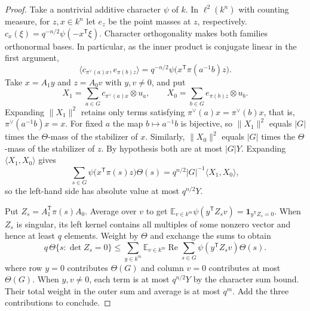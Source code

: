 \begin{proof}
Take a nontrivial additive character $\psi$ of $k$. In $\ell^2(k^n)$ with counting measure,
for $z,x\in k^n$ let $e_z$ be the point masses at $z$, respectively.
$c_x(\xi)=q^{-n/2}\psi(-x^{\mathsf T}\xi)$.
Character orthogonality makes both families orthonormal bases. In particular, as the inner product is conjugate linear in the first argument,
\[
 \langle c_{\pi^\vee(a)x},e_{\pi(b)z}\rangle
 =q^{-n/2}\psi\bigl(x^{\mathsf T}\pi(a^{-1}b)z\bigr).
\]
Take $x=A_1y$ and $z=A_0v$ with $y,v\ne0$, and put
\[
 X_1=\sum_{a\in G}c_{\pi^\vee(a)x}\otimes u_a,\qquad
 X_0=\sum_{b\in G}e_{\pi(b)z}\otimes u_b .
\]
Expanding $\|X_1\|^2$ retains only terms satisfying $\pi^\vee(a)x=\pi^\vee(b)x$, that is,
$\pi^\vee(a^{-1}b)x=x$. For fixed $a$ the map $b\mapsto a^{-1}b$ is bijective,
so $\|X_1\|^2$ equals $|G|$ times the $\Theta$-mass of the stabilizer of $x$.
Similarly, $\|X_0\|^2$ equals $|G|$ times the $\Theta$-mass of the stabilizer of $z$.
By hypothesis both are at most $|G|Y$. Expanding $\langle X_1,X_0\rangle$ gives
\[
 \sum_{s\in G}\psi\bigl(x^{\mathsf T}\pi(s)z\bigr)\Theta(s)
    =q^{n/2}|G|^{-1}\langle X_1,X_0\rangle ,
\]
so the left-hand side has absolute value at most $q^{n/2}Y$.

Put $Z_s=A_1^{\mathsf T}\pi(s)A_0$. Average over $v$ to get
$\mathbb E_{v\in k^m}\psi(y^{\mathsf T}Z_s v)=\mathbf 1_{y^{\mathsf T}Z_s=0}$.
When $Z_s$ is singular, its left kernel contains all multiples of some nonzero vector and hence at least $q$ elements.
Weight by $\Theta$ and exchange the sums to obtain
\[
 q\,\Theta\{s:\det Z_s=0\}
 \le \sum_{y\in k^m}\mathbb E_{v\in k^m}
              \operatorname{Re}\sum_{s\in G}\psi(y^{\mathsf T}Z_s v)\Theta(s).
\]
where row $y=0$ contributes $\Theta(G)$ and column $v=0$ contributes at most $\Theta(G)$.
When $y,v\ne0$, each term is at most $q^{n/2}Y$ by the character sum bound.
Their total weight in the outer sum and average is at most $q^m$.
Add the three contributions to conclude.
\end{proof}


